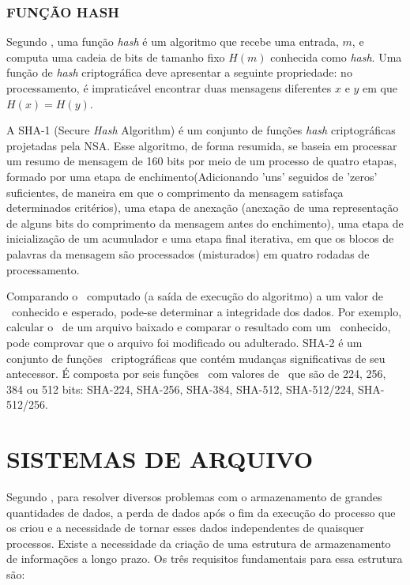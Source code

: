 \subsubsection{FUNÇÃO HASH}

Segundo , uma função \textit{hash} é um algoritmo que recebe uma entrada, $m$, e computa uma cadeia de bits de tamanho fixo $H(m)$ conhecida como \textit{hash}. Uma função de \textit{hash} criptográfica deve apresentar a seguinte propriedade:
no processamento, é impraticável encontrar duas mensagens diferentes $x$ e $y$ em que $H(x)=H(y)$.

A SHA-1 (Secure \textit{Hash} Algorithm) é um conjunto de funções \textit{hash} criptográficas projetadas pela NSA\cite{NSA}. Esse algoritmo, de forma resumida, se baseia em processar um resumo de mensagem de 160 bits por meio de um processo de quatro etapas, formado por uma etapa de enchimento(Adicionando 'uns' seguidos de 'zeros' suficientes, de maneira em que o comprimento da mensagem satisfaça determinados critérios), uma etapa de anexação (anexação de uma representação de alguns bits do comprimento da mensagem antes do enchimento), uma etapa de inicialização de um acumulador e uma etapa final iterativa, em que os blocos de palavras da mensagem são processados (misturados) em quatro rodadas de processamento. 

Comparando o \hash\ computado (a saída de execução do algoritmo) a um valor de \hash\ conhecido e esperado, pode-se determinar a integridade dos dados. Por exemplo, calcular o \hash\ de um arquivo baixado e comparar o resultado com um \hash\ conhecido, pode comprovar que o arquivo foi modificado ou adulterado.
SHA-2 é um conjunto de funções \hash\ criptográficas que contém mudanças significativas de seu antecessor. É composta por seis funções \hash\ com valores de \hash\ que são de 224, 256, 384 ou 512 bits: SHA-224, SHA-256, SHA-384, SHA-512, SHA-512/224, SHA-512/256.



\section{SISTEMAS DE ARQUIVO}
Segundo , para resolver diversos problemas com o armazenamento de grandes quantidades de dados, a perda de dados após o fim da execução do processo que os criou e a necessidade de tornar esses dados independentes de quaisquer processos. Existe a necessidade da criação de uma estrutura de armazenamento de informações a longo prazo. Os três requisitos fundamentais para essa estrutura são:

